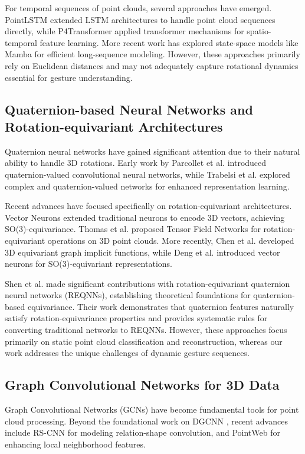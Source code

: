 \documentclass[journal]{IEEEtran}
\theoremstyle{plain}
\begin{document}
For temporal sequences of point clouds, several approaches have emerged. PointLSTM \cite{min_CVPR2020_PointLSTM} extended LSTM architectures to handle point cloud sequences directly, while P4Transformer \cite{fan21p4transformer} applied transformer mechanisms for spatio-temporal feature learning. More recent work has explored state-space models like Mamba \cite{gu2023mamba} for efficient long-sequence modeling. However, these approaches primarily rely on Euclidean distances and may not adequately capture rotational dynamics essential for gesture understanding.

\subsection{Quaternion-based Neural Networks and Rotation-equivariant Architectures}
Quaternion neural networks have gained significant attention due to their natural ability to handle 3D rotations. Early work by Parcollet et al. \cite{parcollet2018quaternion} introduced quaternion-valued convolutional neural networks, while Trabelsi et al. \cite{trabelsi2018deep} explored complex and quaternion-valued networks for enhanced representation learning.

Recent advances have focused specifically on rotation-equivariant architectures. Vector Neurons \cite{deng2021vector} extended traditional neurons to encode 3D vectors, achieving SO(3)-equivariance. Thomas et al. \cite{thomas2018tensor} proposed Tensor Field Networks for rotation-equivariant operations on 3D point clouds. More recently, Chen et al. \cite{chen20213d} developed 3D equivariant graph implicit functions, while Deng et al. \cite{deng2021vector} introduced vector neurons for SO(3)-equivariant representations.

Shen et al. \cite{shen2024interpretable} made significant contributions with rotation-equivariant quaternion neural networks (REQNNs), establishing theoretical foundations for quaternion-based equivariance. Their work demonstrates that quaternion features naturally satisfy rotation-equivariance properties and provides systematic rules for converting traditional networks to REQNNs. However, these approaches focus primarily on static point cloud classification and reconstruction, whereas our work addresses the unique challenges of dynamic gesture sequences.

\subsection{Graph Convolutional Networks for 3D Data}
Graph Convolutional Networks (GCNs) have become fundamental tools for point cloud processing. Beyond the foundational work on DGCNN \cite{wang2019dynamic}, recent advances include RS-CNN \cite{liu2019relation} for modeling relation-shape convolution, and PointWeb \cite{zhao2019pointweb} for enhancing local neighborhood features.
\end{document}
